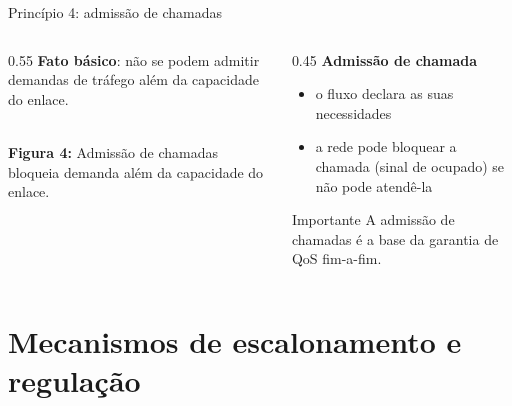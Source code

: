 \documentclass[aspectratio=169,11pt]{beamer}
\begin{document}
\begin{frame}{Princípio 4: admissão de chamadas}
  \begin{columns}
    \begin{column}{0.55\textwidth}
      \textbf{Fato básico}: não se podem admitir demandas de tráfego além da capacidade do enlace.
      \begin{center}
        \\[1mm]
        {\scriptsize \textbf{Figura 4:} Admissão de chamadas bloqueia demanda além da capacidade do enlace.}
      \end{center}
    \end{column}
    \begin{column}{0.45\textwidth}
      \textbf{Admissão de chamada}
      \begin{itemize}
        \item o fluxo declara as suas necessidades
        \item a rede pode bloquear a chamada (sinal de ocupado) se não pode atendê-la
      \end{itemize}
      \begin{alertblock}{Importante}
        A admissão de chamadas é a base da garantia de QoS fim-a-fim.
      \end{alertblock}
    \end{column}
  \end{columns}
\end{frame}

\section{Mecanismos de escalonamento e regulação}
\end{document}

